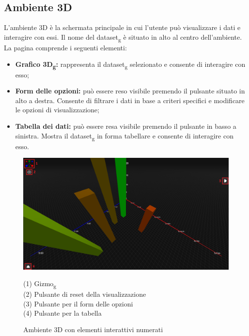\subsection{Ambiente 3D}
L'ambiente 3D è la schermata principale in cui l'utente può visualizzare i dati
e interagire con essi. Il nome del dataset\textsubscript{g} è situato in alto al centro dell'ambiente.
La pagina comprende i seguenti elementi:
\begin{itemize}
    \item \textbf{Grafico 3D\textsubscript{g}:} rappresenta il dataset\textsubscript{g} selezionato e consente di
          interagire con esso;
    \item \textbf{Form delle opzioni:} può essere reso visibile premendo
          il pulsante situato in alto a destra. Consente di filtrare i dati in
          base a criteri specifici e modificare le opzioni di visualizzazione;
    \item \textbf{Tabella dei dati:} può essere resa visibile premendo il
          pulsante in basso a sinistra. Mostra il dataset\textsubscript{g} in forma tabellare e
          consente di interagire con esso.
\end{itemize}
\begin{figure}[ht!]
    \centering
    \includegraphics[scale=0.29]{template/images/envpage.png}
    \caption{Ambiente 3D con elementi interattivi numerati}
    \begin{flushleft}
        \hspace{5.45cm}(1) Gizmo\textsubscript{g}\\
        \hspace{5.45cm}(2) Pulsante di reset della visualizzazione\\
        \hspace{5.45cm}(3) Pulsante per il form delle opzioni\\
        \hspace{5.45cm}(4) Pulsante per la tabella
    \end{flushleft}
\end{figure}
